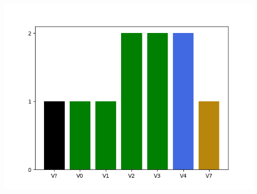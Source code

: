 

















\raggedcolumns
\begin{multicols}{2}



\includegraphics[width=0.9\linewidth]{./maps/plots//Quartzville Creek.png}
\end{multicols}
